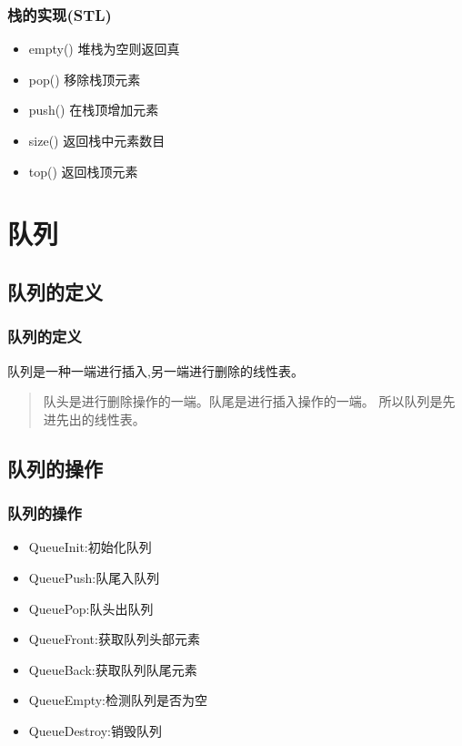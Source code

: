 \documentclass{beamer}
\begin{document}
\begin{frame}
\frametitle{栈的实现(STL)}
\begin{itemize}
    \item empty() 堆栈为空则返回真
    \item pop() 移除栈顶元素
    \item push() 在栈顶增加元素
    \item size() 返回栈中元素数目
    \item top() 返回栈顶元素
\end{itemize}
\end{frame}

\section{队列}
\frame{\sectionpage}
\subsection{队列的定义}
\begin{frame}

\frametitle{队列的定义}
队列是一种一端进行插入,另一端进行删除的线性表。

\begin{quote}
队头是进行删除操作的一端。队尾是进行插入操作的一端。
所以队列是先进先出的线性表。
\end{quote}


\end{frame}
\subsection{队列的操作}
\begin{frame}

\frametitle{队列的操作}

\begin{itemize}
    \item QueueInit:初始化队列
    \item QueuePush:队尾入队列
    \item QueuePop:队头出队列
    \item QueueFront:获取队列头部元素
    \item QueueBack:获取队列队尾元素
    \item QueueEmpty:检测队列是否为空
    \item QueueDestroy:销毁队列
\end{itemize}
\end{frame}
\end{document}
